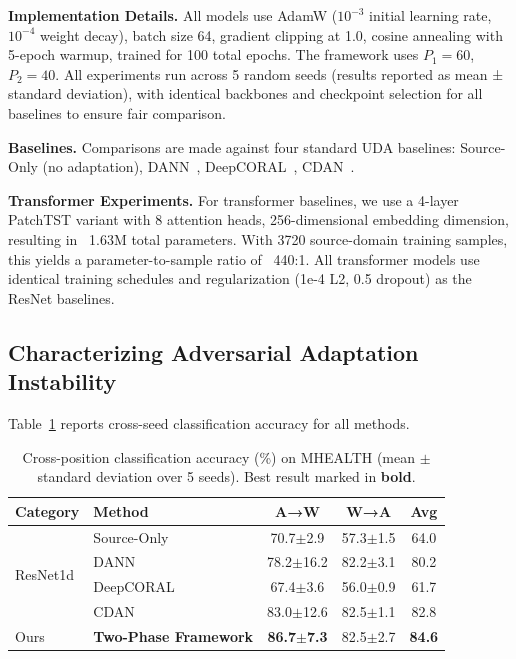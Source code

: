 \documentclass[conference]{IEEEtran}
\begin{document}
\textbf{Implementation Details.} All models use AdamW ($10^{-3}$ initial learning rate, $10^{-4}$ weight decay), batch size 64, gradient clipping at 1.0, cosine annealing with 5-epoch warmup, trained for 100 total epochs. The framework uses $P_1=60$, $P_2=40$. All experiments run across 5 random seeds (results reported as mean ± standard deviation), with identical backbones and checkpoint selection for all baselines to ensure fair comparison.

\textbf{Baselines.} Comparisons are made against four standard UDA baselines: Source-Only (no adaptation), DANN~\cite{ganin2016domain}, DeepCORAL~\cite{sun2016deep}, CDAN~\cite{long2018conditional}.

\textbf{Transformer Experiments.} For transformer baselines, we use a 4-layer PatchTST variant with 8 attention heads, 256-dimensional embedding dimension, resulting in ~1.63M total parameters. With 3720 source-domain training samples, this yields a parameter-to-sample ratio of ~440:1. All transformer models use identical training schedules and regularization (1e-4 L2, 0.5 dropout) as the ResNet baselines.

\subsection{Characterizing Adversarial Adaptation Instability}
\label{sec:instability}
Table~\ref{tab:main} reports cross-seed classification accuracy for all methods.

\begin{table}[!t]
\centering
\caption{Cross-position classification accuracy (\%) on MHEALTH (mean $\pm$ standard deviation over 5 seeds). Best result marked in \textbf{bold}.}
\label{tab:main}
\begin{tabular}{llccc}
\toprule
Category & Method & A→W & W→A & Avg \\
\midrule
\multirow{4}{*}{ResNet1d}
& Source-Only   & 70.7$\pm$2.9 & 57.3$\pm$1.5 & 64.0 \\
& DANN          & 78.2$\pm$16.2 & 82.2$\pm$3.1 & 80.2 \\
& DeepCORAL     & 67.4$\pm$3.6 & 56.0$\pm$0.9 & 61.7 \\
& CDAN          & 83.0$\pm$12.6 & 82.5$\pm$1.1 & 82.8 \\
\midrule
Ours & \textbf{Two-Phase Framework} & \textbf{86.7$\pm$7.3} & 82.5$\pm$2.7 & \textbf{84.6} \\
\bottomrule
\end{tabular}
\end{table}
\end{document}
